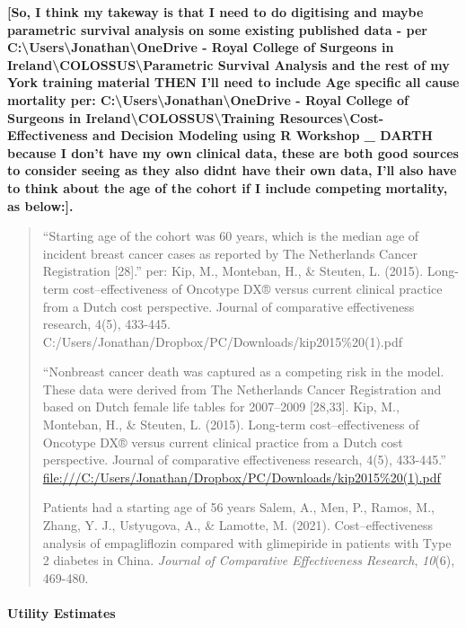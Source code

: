 \documentclass[
]{article}
\begin{document}
\textbf{{[}So, I think my takeway is that I need to do digitising and
maybe parametric survival analysis on some existing published data - per
C:\textbackslash Users\textbackslash Jonathan\textbackslash OneDrive -
Royal College of Surgeons in
Ireland\textbackslash COLOSSUS\textbackslash Parametric Survival
Analysis and the rest of my York training material THEN I'll need to
include Age specific all cause mortality per:
C:\textbackslash Users\textbackslash Jonathan\textbackslash OneDrive -
Royal College of Surgeons in
Ireland\textbackslash COLOSSUS\textbackslash Training
Resources\textbackslash Cost-Effectiveness and Decision Modeling using R
Workshop \_ DARTH because I don't have my own clinical data, these are
both good sources to consider seeing as they also didnt have their own
data, I'll also have to think about the age of the cohort if I include
competing mortality, as below:{]}.}

\begin{quote}
``Starting age of the cohort was 60 years, which is the median age of
incident breast cancer cases as reported by The Netherlands Cancer
Registration {[}28{]}.'' per: Kip, M., Monteban, H., \& Steuten, L.
(2015). Long-term cost--effectiveness of Oncotype DX® versus current
clinical practice from a Dutch cost perspective. Journal of comparative
effectiveness research, 4(5), 433-445.
C:/Users/Jonathan/Dropbox/PC/Downloads/kip2015\%20(1).pdf

``Nonbreast cancer death was captured as a competing risk in the model.
These data were derived from The Netherlands Cancer Registration and
based on Dutch female life tables for 2007--2009 {[}28,33{]}. Kip, M.,
Monteban, H., \& Steuten, L. (2015). Long-term cost--effectiveness of
Oncotype DX® versus current clinical practice from a Dutch cost
perspective. Journal of comparative effectiveness research, 4(5),
433-445.''
\url{file:///C:/Users/Jonathan/Dropbox/PC/Downloads/kip2015\%20(1).pdf}

Patients had a starting age of 56 years Salem, A., Men, P., Ramos, M.,
Zhang, Y. J., Ustyugova, A., \& Lamotte, M. (2021). Cost--effectiveness
analysis of empagliflozin compared with glimepiride in patients with
Type 2 diabetes in China. \emph{Journal of Comparative Effectiveness
Research}, \emph{10}(6), 469-480.
\end{quote}

\hypertarget{utility-estimates}{%
\paragraph{Utility Estimates}\label{utility-estimates}}
\end{document}
